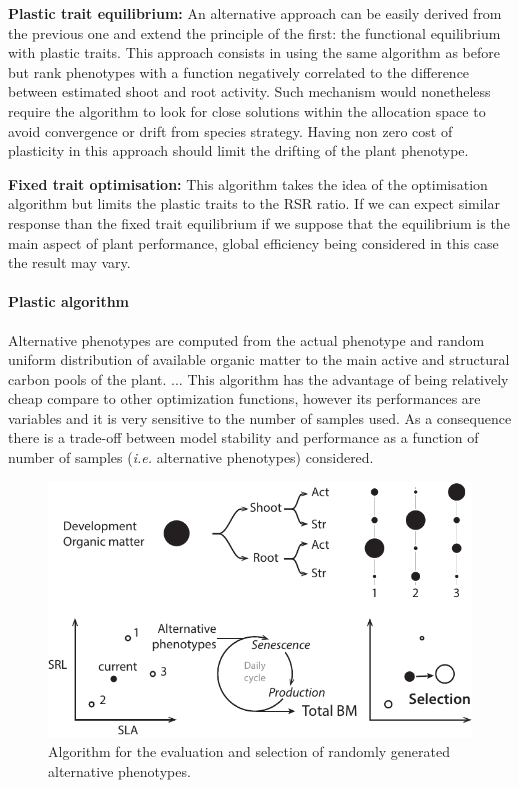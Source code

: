 \textbf{Plastic trait equilibrium:} An alternative approach can be easily derived from the previous one and extend the principle of the first: the functional equilibrium with plastic traits. This approach consists in using the same algorithm as before but rank phenotypes with a function negatively correlated to the difference between estimated shoot and root activity. Such mechanism would nonetheless require the algorithm to look for close solutions within the allocation space to avoid convergence or drift from species strategy. Having non zero cost of plasticity in this approach should limit the drifting of the plant phenotype.

\textbf{Fixed trait optimisation:} This algorithm takes the idea of the optimisation algorithm but limits the plastic traits to the RSR ratio. If we can expect similar response than the fixed trait equilibrium if we suppose that the equilibrium is the main aspect of plant performance, global efficiency being considered in this case the result may vary.

\paragraph{Plastic algorithm}

Alternative phenotypes are computed from the actual phenotype and random uniform distribution of available organic matter to the main active and structural carbon pools of the plant. ... This algorithm has the advantage of being relatively cheap compare to other optimization functions, however its performances are variables and it is very sensitive to the number of samples used. As a consequence there is a trade-off between model stability and performance as a function of number of samples (\textit{i.e.} alternative phenotypes) considered.
\begin{figure}
\includegraphics{./Figures/phenotype_ranking_t.pdf}
\caption{Algorithm for the evaluation and selection of randomly generated alternative phenotypes.}
\end{figure}

